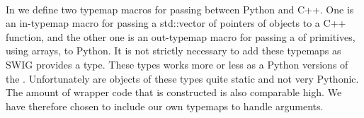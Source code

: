 \paragraph{}
In  we define two typemap macros for passing \- between Python and C++. One is an in-typemap macro for passing a std::vector of pointers of \dolfin objects to a C++ function, and the other one is an out-typemap macro for passing a  of primitives, using \numpy arrays, to Python. It is not strictly necessary to add these typemaps as SWIG provides a  type. These types works more or less as a Python versions of the . Unfortunately are objects of these types quite static and not very Pythonic. The amount of wrapper code that is constructed is also comparable high. We have therefore chosen to include our own typemaps to handle  arguments.\par

